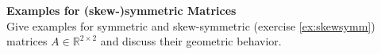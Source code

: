 \textbf{Examples for (skew-)symmetric Matrices}\\
Give examples for symmetric and skew-symmetric (exercise \ref{ex:skewsymm}) matrices $A \in \mathbb{R}^{2 \times 2}$ and discuss their geometric behavior.